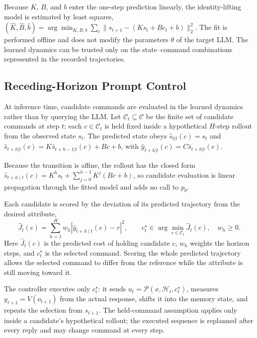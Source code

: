 Because $K$, $B$, and $b$ enter the one-step prediction linearly, the
identity-lifting model is estimated by least squares,
$(\widehat K,\widehat B,\widehat b)=\arg\min_{K,B,b}\sum_t\|s_{t+1}-(Ks_t+Bc_t+b)\|_2^2$.\label{eq:koopman_fit}  %
The fit is performed offline and does not modify the parameters $\theta$
of the target LLM. The learned dynamics can be trusted only on the
state--command combinations represented in the recorded trajectories.


\subsection{Receding-Horizon Prompt Control}
\label{sec:control_method}

At inference time, candidate commands are evaluated in the learned dynamics
rather than by querying the LLM. Let $\mathcal{C}_t\subseteq\mathcal{C}$ be
the finite set of candidate commands at step $t$; each $c\in\mathcal{C}_t$
is held fixed inside a hypothetical $H$-step rollout from the observed state
$s_t$. The predicted state obeys
$\widehat{s}_{t|t}(c)=s_t$ and
$\widehat{s}_{t+h|t}(c)
=
K\widehat{s}_{t+h-1|t}(c)+Bc+b$,
with
$\widehat y_{t+h|t}(c)=C\widehat{s}_{t+h|t}(c)$.

Because the transition is affine, the rollout has the closed form
$\widehat{s}_{t+h\mid t}(c)=K^h s_t+\sum_{j=0}^{h-1}K^j(Bc+b)$, so candidate
evaluation is linear propagation through the fitted model and adds no
call to $p_\theta$.

Each candidate is scored by the deviation of its predicted trajectory from
the desired attribute,
\begin{equation}
    \widehat{J}_t(c)
    =
    \sum_{h=1}^{H}
    w_h
    \left|
        \widehat y_{t+h\mid t}(c)-r
    \right|^2,
    \qquad
    c_t^\star
    \in
    \arg\min_{c\in\mathcal{C}_t}
    \widehat{J}_t(c),
    \quad
    w_h\geq 0.
    \label{eq:predictive_control}
\end{equation}
Here $\widehat{J}_t(c)$ is the predicted cost of holding candidate $c$, $w_h$
weights the horizon steps, and $c_t^\star$ is the selected command. Scoring the
whole predicted trajectory allows the selected command to differ from the
reference while the attribute is still moving toward it.

The controller executes only $c_t^\star$: it sends
$u_t=\mathcal{P}(x,\mathcal{H}_t,c_t^\star)$, measures $y_{t+1}=V(o_{t+1})$
from the actual response, shifts it into the memory state, and repeats the
selection from $s_{t+1}$. The held-command assumption applies only inside a
candidate's hypothetical rollout; the executed sequence is replanned after
every reply and may change command at every step.


